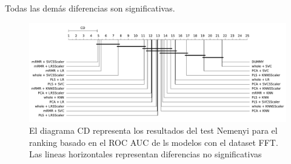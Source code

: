 \documentclass[a4paper,oneside,11pt,leqno]{article}
\begin{document}
	Todas las demás diferencias son significativas.

	\begin{figure}[h]
		\includegraphics[width=\linewidth]{stat_results_fft.pdf}
		\caption{El diagrama CD representa los resultados del test Nemenyi para el ranking basado en el ROC AUC de ls modelos con el dataset FFT. Las lineas horizontales representan diferencias no significativas}
		\label{fig:stats_fig_fft}
	\end{figure}
\end{document}
